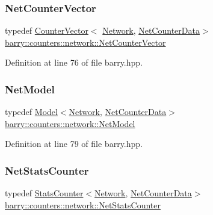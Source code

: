 \subsubsection{\texorpdfstring{Net\+Counter\+Vector}{NetCounterVector}}
{\footnotesize\ttfamily typedef \hyperlink{classbarry_1_1_counter_vector}{Counter\+Vector}$<$ \hyperlink{namespacebarry_1_1counters_1_1network_a4cb88d4572ded3b447ea269c9cd0b2c0}{Network}, \hyperlink{classbarry_1_1counters_1_1network_1_1_net_counter_data}{Net\+Counter\+Data}$>$ \hyperlink{namespacebarry_1_1counters_1_1network_a3b3c590303d47840d1967372ae495d95}{barry\+::counters\+::network\+::\+Net\+Counter\+Vector}}



Definition at line 76 of file barry.\+hpp.

\mbox{\label{namespacebarry_1_1counters_1_1network_a3ab1ee0750d4a5b0f92253874e055358}} 
\subsubsection{\texorpdfstring{Net\+Model}{NetModel}}
{\footnotesize\ttfamily typedef \hyperlink{classbarry_1_1_model}{Model}$<$\hyperlink{namespacebarry_1_1counters_1_1network_a4cb88d4572ded3b447ea269c9cd0b2c0}{Network}, \hyperlink{classbarry_1_1counters_1_1network_1_1_net_counter_data}{Net\+Counter\+Data}$>$ \hyperlink{namespacebarry_1_1counters_1_1network_a3ab1ee0750d4a5b0f92253874e055358}{barry\+::counters\+::network\+::\+Net\+Model}}



Definition at line 79 of file barry.\+hpp.

\mbox{\label{namespacebarry_1_1counters_1_1network_ae26c399917113fe280b3f2859376b8b9}} 
\subsubsection{\texorpdfstring{Net\+Stats\+Counter}{NetStatsCounter}}
{\footnotesize\ttfamily typedef \hyperlink{classbarry_1_1_stats_counter}{Stats\+Counter}$<$\hyperlink{namespacebarry_1_1counters_1_1network_a4cb88d4572ded3b447ea269c9cd0b2c0}{Network}, \hyperlink{classbarry_1_1counters_1_1network_1_1_net_counter_data}{Net\+Counter\+Data}$>$ \hyperlink{namespacebarry_1_1counters_1_1network_ae26c399917113fe280b3f2859376b8b9}{barry\+::counters\+::network\+::\+Net\+Stats\+Counter}}



